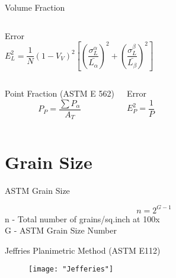 \documentclass[10pt]{beamer}
\begin{document}
{\begin{frame}[fragile]{Volume Fraction}
\begin{columns}[T,onlytextwidth]

\begin{block}{Error}
\small
\begin{equation*}
E_{L}^{2} = \dfrac{1}{N}(1-V_{V})^{2}\left[ \left( \dfrac{\sigma^{\alpha}_{L}}{\bar{L_{\alpha}}} \right)^{2} + \left( \dfrac{\sigma^{\beta}_{L}}{\bar{L_{\beta}}} \right)^{2} \right]
\end{equation*}

\end{block}

\end{columns}

  \begin{columns}[T,onlytextwidth]
\begin{block}{Point Fraction (ASTM E 562)}
\begin{equation*}
P_{P} = \dfrac{\sum P_{\alpha}}{A_{T}}
\end{equation*} 
\end{block}
 

\begin{block}{Error}
\begin{equation*}
E_{P}^{2} = \dfrac{1}{P}
\end{equation*} 
\end{block}

\end{columns}


 
    
\end{frame}
}
\section{Grain Size}

{%
\begin{frame}[fragile]{ASTM Grain Size}

\begin{equation*}
n = 2^{G-1}
\end{equation*}
n - Total number of grains/sq.inch at 100x \\
G - ASTM Grain Size Number    
\end{frame}
}

{%
\begin{frame}[fragile]{Jeffries Planimetric Method (ASTM E112)}

\begin{figure}[H]
\texttt{[image: "Jefferies"]}
\end{figure}
\end{frame}
}
\end{document}
